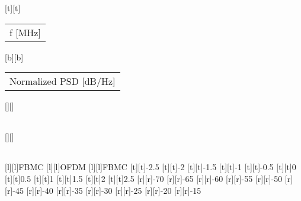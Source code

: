 %    
%
%
%
[t][t]{\fontsize{9}{13.5}\selectfont \color[rgb]{0.15,0.15,0.15}\setlength{\tabcolsep}{0pt}\begin{tabular}{c}f [MHz]\end{tabular}}%
[b][b]{\fontsize{9}{13.5}\selectfont \color[rgb]{0.15,0.15,0.15}\setlength{\tabcolsep}{0pt}\begin{tabular}{c}Normalized PSD [dB/Hz]\end{tabular}}%
[][]{\fontsize{10}{15}\selectfont \color[rgb]{0,0,0}\setlength{\tabcolsep}{0pt}\begin{tabular}{c} \end{tabular}}%
[][]{\fontsize{10}{15}\selectfont \color[rgb]{0,0,0}\setlength{\tabcolsep}{0pt}\begin{tabular}{c} \end{tabular}}%
[l][l]{\fontsize{9}{13.5}\selectfont \color[rgb]{0,0,0}FBMC}%
[l][l]{\fontsize{9}{13.5}\selectfont \color[rgb]{0,0,0}OFDM}%
[l][l]{\fontsize{9}{13.5}\selectfont \color[rgb]{0,0,0}FBMC}%
%
\fontsize{9}{13.5}%
\selectfont%
%
[t][t]{-2.5}%
[t][t]{-2}%
[t][t]{-1.5}%
[t][t]{-1}%
[t][t]{-0.5}%
[t][t]{0}%
[t][t]{0.5}%
[t][t]{1}%
[t][t]{1.5}%
[t][t]{2}%
[t][t]{2.5}%
%
[r][r]{-70}%
[r][r]{-65}%
[r][r]{-60}%
[r][r]{-55}%
[r][r]{-50}%
[r][r]{-45}%
[r][r]{-40}%
[r][r]{-35}%
[r][r]{-30}%
[r][r]{-25}%
[r][r]{-20}%
[r][r]{-15}%
%
%
